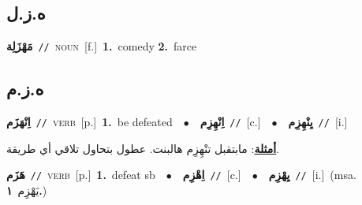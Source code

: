 \documentclass[10pt,a4paper,twoside]{article} %
\begin{document}
\begin{multicols}{2}
\vspace{-3mm}
\subsection*{\color{blue}\foreignlanguage{arabic}{ه.ز.ل}\color{blue}{}} 

{\setlength\topsep{0pt}\textbf{\foreignlanguage{arabic}{مَهْزَلِة}}\ {\color{gray}\texttt{//}\color{black}}\ \textsc{noun}\ [f.]\ \textbf{1.}~comedy  \textbf{2.}~farce\ } \vspace{2mm}

\vspace{-3mm}
\subsection*{\color{blue}\foreignlanguage{arabic}{ه.ز.م}\color{blue}{}} 

{\setlength\topsep{0pt}\textbf{\foreignlanguage{arabic}{اِنْهَزَم}}\ {\color{gray}\texttt{//}\color{black}}\ \textsc{verb}\ [p.]\ \textbf{1.}~be defeated\ \ $\bullet$\ \ \setlength\topsep{0pt}\textbf{\foreignlanguage{arabic}{اِنْهِزِم}}\ {\color{gray}\texttt{//}\color{black}}\ [c.]\ \ $\bullet$\ \ \setlength\topsep{0pt}\textbf{\foreignlanguage{arabic}{يِنْهِزِم}}\ {\color{gray}\texttt{//}\color{black}}\ [i.]\  \begin{flushright}\color{gray}\foreignlanguage{arabic}{\textbf{\underline{\foreignlanguage{arabic}{أمثلة}}}: مابتقبل تنْهِزِم هالبنت. عطول بتحاول تلاقي أي طريقة.}\end{flushright}\color{black}} \vspace{2mm}

{\setlength\topsep{0pt}\textbf{\foreignlanguage{arabic}{هَزَم}}\ {\color{gray}\texttt{//}\color{black}}\ \textsc{verb}\ [p.]\ \textbf{1.}~defeat sb\ \ $\bullet$\ \ \setlength\topsep{0pt}\textbf{\foreignlanguage{arabic}{اِهْزِم}}\ {\color{gray}\texttt{//}\color{black}}\ [c.]\ \ $\bullet$\ \ \setlength\topsep{0pt}\textbf{\foreignlanguage{arabic}{يِهْزِم}}\ {\color{gray}\texttt{//}\color{black}}\ [i.]\ \color{gray}(msa. \foreignlanguage{arabic}{يَهْزِم}~\foreignlanguage{arabic}{\textbf{١.}})\color{black}\ } \vspace{2mm}


\end{multicols}
\end{document}
